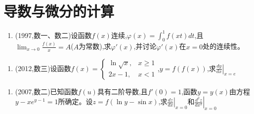 \documentclass[12pt, a4paper, oneside, UTF8]{ctexbook}
\begin{document}
\section{导数与微分的计算}

\begin{remark}
\end{remark}

\begin{enumerate}[label=\arabic*.,start=4]
    \item (1997,数一、数二)设函数$f(x)$连续,$\varphi(x)=\int_0^1 f(xt)dt$,且$\lim_{x\to0}\frac{f(x)}{x}=A$($A$为常数),求$\varphi'(x)$,并讨论$\varphi'(x)$在$x=0$处的连续性。
    
    \begin{solution}
    \newpage
    \end{solution}
\end{enumerate}

\begin{remark}
\end{remark}

\begin{enumerate}[label=\arabic*.,start=5]
    \item (2012,数三)设函数$f(x)=\begin{cases}
        \ln\sqrt{x}, & x\geq1 \\
        2x-1, & x<1
    \end{cases}$,$y=f(f(x))$,求$\left.\frac{dy}{dx}\right|_{x=e}$
    
    \begin{solution}
    \newpage
    \end{solution}
\end{enumerate}

\begin{remark}
\end{remark}

\begin{enumerate}[label=\arabic*.,start=6]
    \item (2007,数二)已知函数$f(u)$具有二阶导数,且$f'(0)=1$,函数$y=y(x)$由方程$y-xe^{y-1}=1$所确定。设$z=f(\ln y-\sin x)$,求$\left.\frac{dz}{dx}\right|_{x=0}$和$\left.\frac{d^2z}{dx^2}\right|_{x=0}$
    
    \begin{solution}
    \newpage
    \end{solution}
\end{enumerate}

\begin{remark}
\end{remark}
\end{document}
